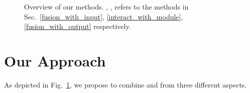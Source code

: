 \begin{figure}[!t]
\centering
{}
\hspace{.5in}
\caption{Overview of our methods. , ,  refers to the methods in
Sec.~\ref{fusion_with_input}, \ref{interact_with_module}, \ref{fusion_with_output} respectively.}
\label{fig_overview}
\end{figure}
\section{Our Approach}
As depicted in Fig.~\ref{fig_overview}, we propose  to combine \NN and \REs from three different aspects.

